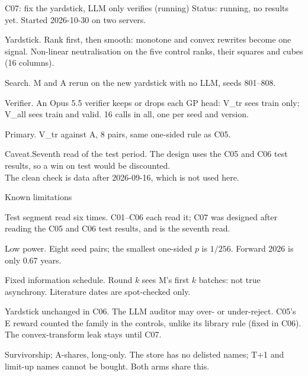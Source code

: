 \documentclass[t,20pt]{beamer}
\newcommand\secsize{\fontsize{16}{20}\selectfont}
\newcommand\key[1]{{\mediumfont\color{accent}#1}}
\newcommand\lead[1]{{\mediumfont #1}}
\newenvironment{blist}{%
  \begin{list}{\textcolor{sec}{\textbullet}}{\def\makelabel##1{##1\hfil}%
    \setlength\leftmargin{0.34in}\setlength\labelwidth{0.2in}\setlength\labelsep{0.14in}%
    \setlength\itemsep{16pt}\setlength\parsep{0pt}\setlength\topsep{0pt}\setlength\partopsep{0pt}%
    \setlength\itemindent{0pt}\setlength\listparindent{0pt}\setlength\rightmargin{0pt}}}%
  {\end{list}}
\newcounter{nl}
\newcommand\gap[1]{\par\vspace{#1}}
\newcommand\textfirst{\vspace*{-0.14in}}
\begin{document}
\begin{frame}{C07: fix the yardstick, LLM only verifies (running)}
\textfirst
\key{Status: running, no results yet.} Started 2026-10-30 on two servers.
\gap{0.18in}
\begin{blist}
  \item \lead{Yardstick.} Rank first, then smooth: monotone and convex rewrites become one signal. Non-linear neutralisation on the five control ranks, their squares and cubes (16 columns).
  \item \lead{Search.} M and A rerun on the new yardstick with no LLM, seeds 801–808.
  \item \lead{Verifier.} An Opus 5.5 verifier keeps or drops each GP head: V\_tr sees train only; V\_all sees train and valid. 16 calls in all, one per seed and version.
  \item \lead{Primary.} V\_tr against A, 8 pairs, same one-sided rule as C05.
\end{blist}
\gap{0.30in}
\begingroup\secsize
\key{Caveat.}\enspace Seventh read of the test period. The design uses the C05 and C06 test results, so a win on test would be discounted.\\
The clean check is data after 2026-09-16, which is not used here.
\endgroup
\end{frame}

\begin{frame}{Known limitations}
\textfirst
\begin{blist}
  \item \lead{Test segment read six times.} C01–C06 each read it; C07 was designed after reading the C05 and C06 test results, and is the seventh read.
  \item \lead{Low power.} Eight seed pairs; the smallest one-sided $p$ is $1/256$. Forward 2026 is only 0.67 years.
  \item \lead{Fixed information schedule.} Round $k$ sees M's first $k$ batches: not true asynchrony. Literature dates are spot-checked only.
  \item \lead{Yardstick unchanged in C06.} The LLM auditor may over- or under-reject. C05's E reward counted the family in the controls, unlike its library rule (fixed in C06). The convex-transform leak stays until C07.
  \item \lead{Survivorship; A-shares, long-only.} The store has no delisted names; T+1 and limit-up names cannot be bought. Both arms share this.
\end{blist}
\end{frame}
\end{document}
